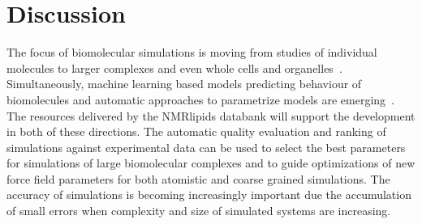\documentclass[fleqn,10pt]{wlscirep}
\begin{document}
\section{Discussion}


The focus of biomolecular simulations is moving from studies of individual molecules to larger complexes and even whole cells and organelles~\cite{johnson15,thornburg22,gupta22}. Simultaneously, machine learning based models predicting behaviour of biomolecules and automatic approaches to parametrize models are emerging~\cite{jumper21,antila22b}. The resources delivered by the NMRlipids databank will support the development in both of these directions. The automatic quality evaluation and ranking of simulations against experimental data can be used to select the best parameters for simulations of large biomolecular complexes and to guide optimizations of new force field parameters for both atomistic and coarse grained simulations. The accuracy of simulations is becoming increasingly important due the accumulation of small errors when complexity and size of simulated systems are increasing.
\end{document}
